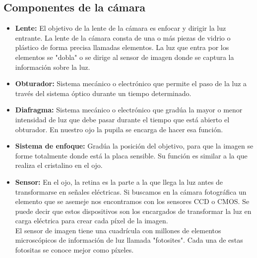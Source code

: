 \subsection{Componentes de la cámara}
\begin{itemize}
    \item \textbf{Lente: }El objetivo de la lente de la cámara es enfocar y dirigir
          la luz entrante. La lente de la cámara consta de una o más piezas de vidrio o
          plástico de forma precisa llamadas elementos. La luz que entra por los elementos
          se "dobla" o se dirige al sensor de imagen donde se captura la información sobre
          la luz.
    \item \textbf{Obturador:} Sistema mecánico o electrónico que permite el paso de la
          luz a través del sistema óptico  durante un tiempo determinado.
    \item \textbf{Diafragma: }Sistema mecánico o electrónico que gradúa la mayor o
          menor intensidad de luz que debe   pasar durante el tiempo que está abierto el
          obturador. En nuestro ojo la pupila se encarga de hacer esa función.
    \item \textbf{Sistema de enfoque: }Gradúa la posición del  objetivo, para que la
          imagen se forme totalmente donde  está la placa sensible. Su función es similar a
          la que realiza el cristalino en el ojo.
    \item \textbf{Sensor: }En el ojo, la retina es la parte a la que llega la luz
          antes de transformarse en señales eléctricas. Si buscamos en la cámara fotográfica
          un elemento que se asemeje nos encontramos con los sensores CCD o CMOS. Se
          puede decir que estos dispositivos son los encargados de transformar la luz en
          carga eléctrica para crear cada píxel de la imagen.\\
          El sensor de imagen tiene una cuadrícula con millones de elementos microscópicos
          de información de luz llamada "fotosites".
          Cada una de estas fotositas se conoce mejor como píxeles.
\end{itemize}
